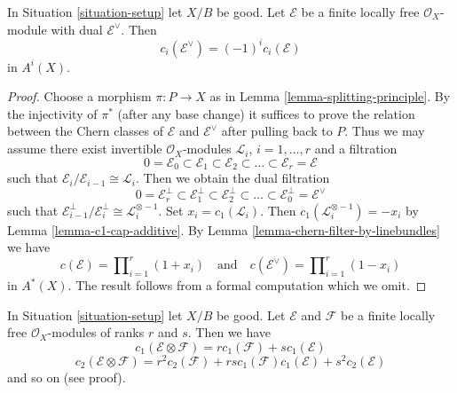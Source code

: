 \begin{lemma}
\label{lemma-chern-classes-dual}
In Situation \ref{situation-setup} let $X/B$ be good.
Let $\mathcal{E}$ be a finite locally free $\mathcal{O}_X$-module
with dual $\mathcal{E}^\vee$. Then
$$
c_i(\mathcal{E}^\vee) = (-1)^i c_i(\mathcal{E})
$$
in $A^i(X)$.
\end{lemma}

\begin{proof}
Choose a morphism $\pi : P \to X$ as in
Lemma \ref{lemma-splitting-principle}.
By the injectivity of $\pi^*$ (after any base change)
it suffices to prove the relation between
the Chern classes of $\mathcal{E}$ and $\mathcal{E}^\vee$
after pulling back to $P$. Thus we may assume there
exist invertible $\mathcal{O}_X$-modules
${\mathcal L}_i$, $i = 1, \ldots, r$
and a filtration
$$
0 = \mathcal{E}_0 \subset \mathcal{E}_1 \subset \mathcal{E}_2
\subset \ldots \subset \mathcal{E}_r = \mathcal{E}
$$
such that $\mathcal{E}_i/\mathcal{E}_{i - 1} \cong \mathcal{L}_i$.
Then we obtain the dual filtration
$$
0 = \mathcal{E}_r^\perp \subset \mathcal{E}_1^\perp \subset \mathcal{E}_2^\perp
\subset \ldots \subset \mathcal{E}_0^\perp = \mathcal{E}^\vee
$$
such that $\mathcal{E}_{i - 1}^\perp/\mathcal{E}_i^\perp \cong
\mathcal{L}_i^{\otimes -1}$.
Set $x_i = c_1(\mathcal{L}_i)$.
Then $c_1(\mathcal{L}_i^{\otimes -1}) = - x_i$
by Lemma \ref{lemma-c1-cap-additive}.
By Lemma \ref{lemma-chern-filter-by-linebundles}
we have
$$
c(\mathcal{E}) = \prod\nolimits_{i = 1}^r (1 + x_i)
\quad\text{and}\quad
c(\mathcal{E}^\vee) = \prod\nolimits_{i = 1}^r (1 - x_i)
$$
in $A^*(X)$. The result follows from a formal computation
which we omit.
\end{proof}

\begin{lemma}
\label{lemma-chern-classes-tensor-product}
In Situation \ref{situation-setup} let $X/B$ be good.
Let $\mathcal{E}$ and $\mathcal{F}$ be a finite locally free
$\mathcal{O}_X$-modules of ranks $r$ and $s$. Then we have
$$
c_1(\mathcal{E} \otimes \mathcal{F})
=
r c_1(\mathcal{F}) + s c_1(\mathcal{E})
$$
$$
c_2(\mathcal{E} \otimes \mathcal{F})
=
r^2 c_2(\mathcal{F}) +
rs c_1(\mathcal{F})c_1(\mathcal{E}) +
s^2 c_2(\mathcal{E})
$$
and so on (see proof).
\end{lemma}

